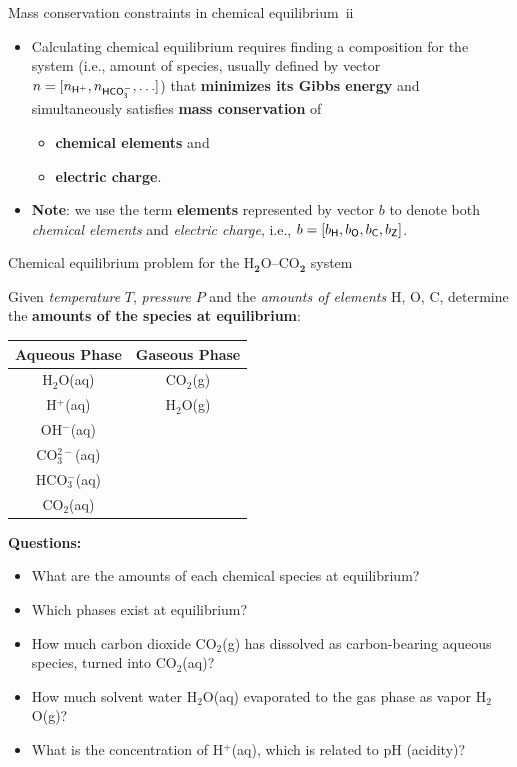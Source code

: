 %
\begin{frame}{Mass conservation constraints in chemical equilibrium\, ii}
\begin{itemize}
		\item Calculating chemical equilibrium requires finding a composition for
		the system (i.e., amount of species, usually defined by vector 
		$n = [n_{\sf H^{+}}, n_{\sf HCO_{3}^{-}}, \ldots]$) that 
		\textbf{minimizes its Gibbs energy} and simultaneously satisfies 
		\alert{\textbf{mass conservation}} of
		\begin{itemize}
			\item \textbf{chemical elements} and
			\item \textbf{electric charge}.
		\end{itemize}
		\pause
		\item \alert{\textbf{Note}}: we use the term \alert{\textbf{elements}} represented by vector $b$ 
		to denote both \emph{chemical elements} and \emph{electric charge}, i.e., 
		$b = [b_{\sf H}, b_{\sf O}, b_{\sf C}, b_{\sf Z}]$.
	\end{itemize}
\end{frame}
%
%
\begin{frame}{Chemical equilibrium problem for the H$_{\boldsymbol{2}}$O–CO$_{\boldsymbol{2}}$
system}

\lcol

Given \emph{temperature} $T$, \emph{pressure} $P$ and the \emph{amounts
of elements} H, O, C, determine \\
the \textbf{amounts of the species at equilibrium}:
\begin{center}
\begin{tabular}{cc}
\toprule 
\multicolumn{1}{c}{\textbf{Aqueous Phase}} & \multicolumn{1}{c}{\textbf{Gaseous Phase}}\tabularnewline
\midrule
H$_{2}$O(aq) & CO$_{2}$(g)\tabularnewline
H$^{+}$(aq) & H$_{2}$O(g)\tabularnewline
OH$^{-}$(aq) & \tabularnewline
CO$_{3}^{2-}$(aq) & \tabularnewline
HCO$_{3}^{-}$(aq) & \tabularnewline
CO$_{2}$(aq) & \tabularnewline
\bottomrule
\end{tabular} 
\par\end{center}

\rcol
\pause
\vskip 5pt
\alert{\textbf{Questions:}}
\begin{itemize}
\item What are the amounts of each chemical species at equilibrium? 
\item Which phases exist at equilibrium? 
\item How much carbon dioxide CO$_{2}$(g) has dissolved as carbon-bearing
aqueous species, turned into CO$_{2}$(aq)? 
\item How much solvent water H$_{2}$O(aq) evaporated to the gas phase
as vapor H$_{2}$O(g)? 
\item What is the concentration of H$^{+}$(aq), which is related to pH
(acidity)?
\end{itemize}
\ecol
\end{frame}
